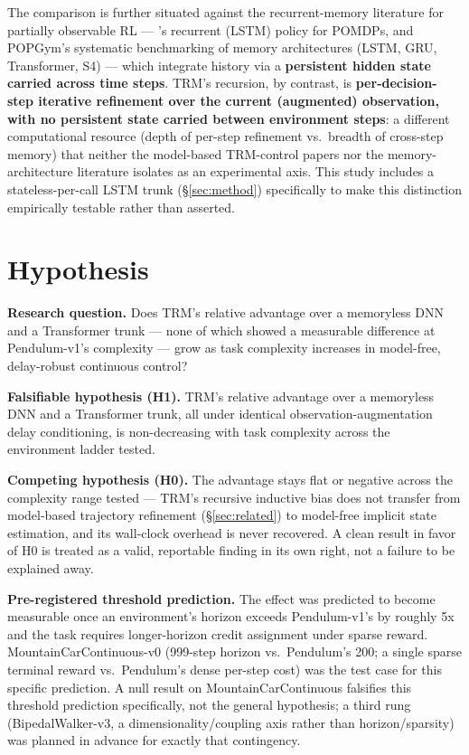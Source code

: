 \documentclass[11pt]{article}
\begin{document}
The comparison is further situated against the recurrent-memory literature for partially observable RL --- \citet{bakker2007recurrent}'s recurrent (LSTM) policy for POMDPs, and POPGym's \citep{morad2023popgym} systematic benchmarking of memory architectures (LSTM, GRU, Transformer, S4) --- which integrate history via a \textbf{persistent hidden state carried across time steps}. TRM's recursion, by contrast, is \textbf{per-decision-step iterative refinement over the current (augmented) observation, with no persistent state carried between environment steps}: a different computational resource (depth of per-step refinement vs.\ breadth of cross-step memory) that neither the model-based TRM-control papers nor the memory-architecture literature isolates as an experimental axis. This study includes a stateless-per-call LSTM trunk (\S\ref{sec:method}) specifically to make this distinction empirically testable rather than asserted.

\section{Hypothesis}
\label{sec:hypothesis}

\textbf{Research question.} Does TRM's relative advantage over a memoryless DNN and a Transformer trunk --- none of which showed a measurable difference at Pendulum-v1's complexity --- grow as task complexity increases in model-free, delay-robust continuous control?

\textbf{Falsifiable hypothesis (H1).} TRM's relative advantage over a memoryless DNN and a Transformer trunk, all under identical observation-augmentation delay conditioning, is non-decreasing with task complexity across the environment ladder tested.

\textbf{Competing hypothesis (H0).} The advantage stays flat or negative across the complexity range tested --- TRM's recursive inductive bias does not transfer from model-based trajectory refinement (\S\ref{sec:related}) to model-free implicit state estimation, and its wall-clock overhead is never recovered. A clean result in favor of H0 is treated as a valid, reportable finding in its own right, not a failure to be explained away.

\textbf{Pre-registered threshold prediction.} The effect was predicted to become measurable once an environment's horizon exceeds Pendulum-v1's by roughly 5x and the task requires longer-horizon credit assignment under sparse reward. MountainCarContinuous-v0 (999-step horizon vs.\ Pendulum's 200; a single sparse terminal reward vs.\ Pendulum's dense per-step cost) was the test case for this specific prediction. A null result on MountainCarContinuous falsifies this threshold prediction specifically, not the general hypothesis; a third rung (BipedalWalker-v3, a dimensionality/coupling axis rather than horizon/sparsity) was planned in advance for exactly that contingency.
\end{document}
